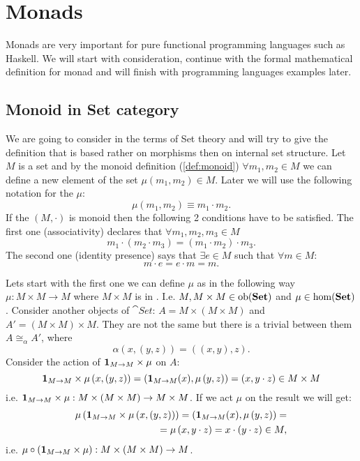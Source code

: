\chapter{Monads}

Monads are very important for pure functional programming languages
such as Haskell. We will start with 
consideration, continue with the formal mathematical definition for
monad and
will finish with programming languages examples later.

\section{Monoid in \textbf{Set} category}
We are going to consider  in the terms of Set theory and
will try to give the definition that is based rather on morphisms then
on internal set structure. Let $M$ is a set and by the monoid
definition (\cref{def:monoid})
$\forall m_1, m_2 \in M$ we can define a new element of the set
$\mu(m_1, m_2) \in M$. Later we will use the following notation for
the $\mu$:
\[
\mu(m_1, m_2) \equiv m_1 \cdot m_2.
\]
If the $(M, \cdot)$ is monoid then the following 2 conditions have to
be satisfied. The first one (associativity) declares that $\forall
m_1, m_2, m_3 \in M$ 
\[
m_1 \cdot ( m_2 \cdot m_3) = ( m_1 \cdot
m_2 ) \cdot m_3.
\]
The second one (identity presence) says that
\(
\exists e \in M
\) such that $\forall m \in M$:
\begin{equation}
m \cdot e = e \cdot m = m.
\label{eq:monoid2}
\end{equation}

Lets start with the first one we can define $\mu$ as
 in the following way $\mu: M\times M \to M$
where $M \times M$ is  in
. I.e. $M, M \times M \in \mathrm{ob}(\mathbf{Set})$ and
$\mu \in \mathrm{hom}(\mathbf{Set})$.  Consider another objects of $\cat{Set}$: $A =
M \times \left( M \times M \right)$ and $A' = \left( M \times M \right)
\times M$. They are not the same but there is a trivial
 between them $A \cong_\alpha A'$, where
\[
\alpha(x,(y,z)) = ((x,y),z).
\]
Consider the action of  
$\mathbf{1}_{ M \to M } \times \mu$ on $A$:
\[
\mathbf{1}_{ M \to M } \times \mu \left(x,\left(y,z\right)\right) = 
\left(\mathbf{1}_{ M \to M }(x),\mu\left(y,z\right)\right) = 
\left(x, y \cdot z\right) \in M \times M
\]
i.e. $\mathbf{1}_{ M \to M } \times \mu: M \times \left( M \times M \right) \to M
\times M$. If we act $\mu$ on the result we will get:
\begin{eqnarray}
\mu \left(\mathbf{1}_{ M \to M } \times \mu \left(x,\left(y,z\right)\right)\right) = 
\left(\mathbf{1}_{ M \to M }(x),\mu\left(y,z\right)\right) = 
\nonumber \\
=
\mu\left(x, y \cdot z\right) = x \cdot (y\cdot z) \in M,
\nonumber
\end{eqnarray}
i.e. 
$\mu \circ \left(\mathbf{1}_{ M \to M } \times \mu\right): M \times \left( M \times M
\right) \to M$.

